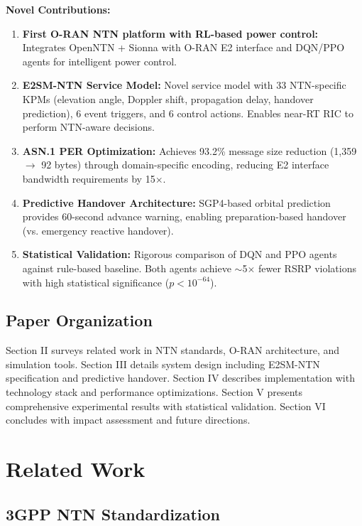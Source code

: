 \documentclass[conference]{IEEEtran}
\begin{document}
\textbf{Novel Contributions:}

\begin{enumerate}
    \item \textbf{First O-RAN NTN platform with RL-based power control:} Integrates OpenNTN + Sionna with O-RAN E2 interface and DQN/PPO agents for intelligent power control.

    \item \textbf{E2SM-NTN Service Model:} Novel service model with 33 NTN-specific KPMs (elevation angle, Doppler shift, propagation delay, handover prediction), 6 event triggers, and 6 control actions. Enables near-RT RIC to perform NTN-aware decisions.

    \item \textbf{ASN.1 PER Optimization:} Achieves 93.2\% message size reduction (1,359 $\rightarrow$ 92 bytes) through domain-specific encoding, reducing E2 interface bandwidth requirements by 15$\times$.

    \item \textbf{Predictive Handover Architecture:} SGP4-based orbital prediction provides 60-second advance warning, enabling preparation-based handover (vs. emergency reactive handover).

    \item \textbf{Statistical Validation:} Rigorous comparison of DQN and PPO agents against rule-based baseline. Both agents achieve $\sim$5$\times$ fewer RSRP violations with high statistical significance ($p < 10^{-64}$).
\end{enumerate}

\subsection{Paper Organization}

Section II surveys related work in NTN standards, O-RAN architecture, and simulation tools. Section III details system design including E2SM-NTN specification and predictive handover. Section IV describes implementation with technology stack and performance optimizations. Section V presents comprehensive experimental results with statistical validation. Section VI concludes with impact assessment and future directions.

\section{Related Work}

\subsection{3GPP NTN Standardization}
\end{document}
